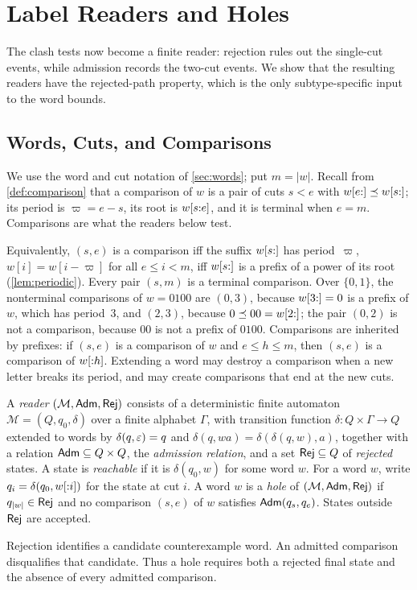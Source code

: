\section{Label Readers and Holes}
\label{sec:holes}

The clash tests now become a finite reader: rejection rules out the
single-cut events, while admission records the two-cut events. We show that
the resulting readers have the rejected-path property, which is the only
subtype-specific input to the word bounds.

\subsection{Words, Cuts, and Comparisons}

We use the word and cut notation of \cref{sec:words}; put $m=|w|$. Recall
from \cref{def:comparison} that a comparison of $w$ is a pair of cuts $s<e$
with $w[e{:}]\preceq w[s{:}]$; its period is $\varpi=e-s$, its root is
$w[s{:}e]$, and it is terminal when $e=m$. Comparisons are what the
readers below test.

Equivalently, $(s,e)$ is a comparison iff the suffix $w[s{:}]$ has period~$\varpi$, \ie
$w[i] = w[i-\varpi]$ for all $e \le i < m$, iff $w[s{:}]$ is a prefix of a power of its
root (\cref{lem:periodic}). Every pair $(s,m)$ is a terminal comparison. Over $\{0,1\}$, the
nonterminal comparisons of $w = 0100$ are $(0,3)$, because $w[3{:}] = 0$ is a prefix of
$w$, which has period~$3$, and $(2,3)$, because $0 \preceq 00 = w[2{:}]$; the pair $(0,2)$ is
not a comparison, because $00$ is not a prefix of $0100$. Comparisons are inherited by
prefixes: if $(s,e)$ is a comparison of $w$ and $e \le h \le m$, then $(s,e)$ is a
comparison of $w[{:}h]$. Extending a word may destroy a comparison when a new letter breaks its
period, and may create comparisons that end at the new cuts.


\begin{definition}\label{def:reader-hole}
A \emph{reader} $(\mathcal{M},\mathsf{Adm},\mathsf{Rej})$ consists of a deterministic finite automaton
$\mathcal{M} = (Q,q_0,\delta)$ over a finite alphabet $\Gamma$, with transition function
$\delta : Q \times \Gamma \to Q$ extended to words by $\delta(q,\varepsilon) = q$ and
$\delta(q,wa) = \delta(\delta(q,w),a)$, together with a relation $\mathsf{Adm} \subseteq Q \times Q$,
the \emph{admission relation}, and a set $\mathsf{Rej} \subseteq Q$ of \emph{rejected} states. A
state is \emph{reachable} if it is $\delta(q_0,w)$ for some word $w$. For a word $w$, write
$q_i = \delta(q_0,w[{:}i])$ for the state at cut $i$. A word $w$ is a \emph{hole} of
$(\mathcal{M},\mathsf{Adm},\mathsf{Rej})$ if $q_{\lvert w\rvert} \in \mathsf{Rej}$ and no comparison $(s,e)$ of $w$ satisfies
$\mathsf{Adm}(q_s,q_e)$. States outside $\mathsf{Rej}$ are accepted.
\end{definition}
Rejection identifies a candidate counterexample word. An admitted comparison
disqualifies that candidate. Thus a hole requires both a rejected final state and the
absence of every admitted comparison.



